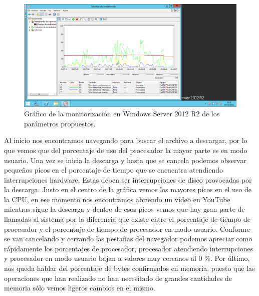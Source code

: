 \begin{figure}[H]
	\centering
	\includegraphics[scale=0.4]{perfmon.png}
	\caption{Gráfico de la monitorización en Windows Server 2012 R2 de los parámetros propuestos.}
\end{figure}

Al inicio nos encontramos navegando para buscar el archivo a descargar, por lo que vemos que del porcentaje de uso del procesador la mayor parte es en modo usuario. Una vez se inicia la descarga y hasta que se cancela podemos observar pequeños picos en el porcentaje de tiempo que se encuentra atendiendo interrupciones hardware. Estas deben ser interrupciones de disco provocadas por la descarga. Justo en el centro de la gráfica vemos los mayores picos en el uso de la CPU, en ese momento nos encontramos abriendo un vídeo en YouTube mientras sigue la descarga y dentro de esos picos vemos que hay gran parte de llamadas al sistema por la diferencia que existe entre el porcentaje de tiempo de procesador y el porcentaje de tiempo de procesador en modo usuario. Conforme se van cancelando y cerrando las pestañas del navegador podemos apreciar como rápidamente los porcentajes de procesador, procesador atendiendo interrupciones y procesador en modo usuario	bajan a valores muy cercanos al 0 \%. Por último, nos queda hablar del porcentaje de bytes confirmados en memoria, puesto que las operaciones que han realizado no han necesitado de grandes cantidades de memoria sólo vemos ligeros cambios en el mismo.


